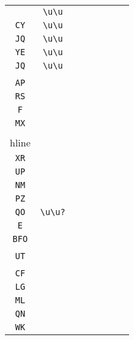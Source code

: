\begin{longtable}{cccccccc}
\begin{tabular}{ll}
    \verb|KX| & \verb|\u\u|\\
\verb|CY| & \verb|\u\u|\\
\verb|JQ| & \verb|\u\u|\\
\verb|YE| & \verb|\u\u|\\
\verb|JQ| & \verb|\u\u|
\end{tabular}
\\\midrule 
\begin{tabular}{l}
    \verb|IH|\\
\verb|AP|\\
\verb|RS|\\
\verb|F|\\
\verb|MX|\\
\\hline\\
\verb|XR|\\
\verb|UP|\\
\verb|NM|\\
\verb|PZ|\\
\verb|QO|
\end{tabular}

&
\verb|\u\u?|
&

\begin{tabular}{l}
    \verb|(\u)*|\\
\verb|E|\\
\verb|BFO|\\
\verb||\\
\verb|UT|\\
\verb||
\end{tabular}

&

\begin{tabular}{l}
    \verb.\u|(\u).\\
\verb|CF|\\
\verb|LG|\\
\verb|ML|\\
\verb|QN|\\
\verb|WK|
\end{tabular}

&


\end{longtable}
